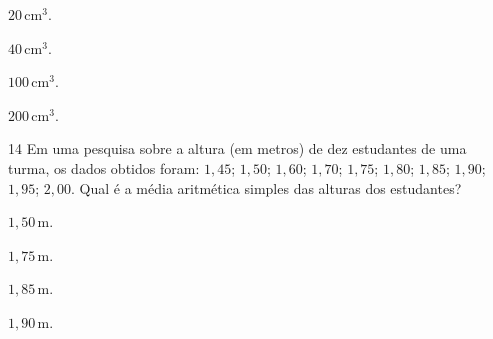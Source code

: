 \begin{escolha}
\item $20\,\text{cm}^3$.
\item $40\,\text{cm}^3$.
\item $100\,\text{cm}^3$.
\item $200\,\text{cm}^3$.
\end{escolha}



\num{14} Em uma pesquisa sobre a altura (em metros) de dez estudantes de uma turma, os
dados obtidos foram: $1,45$; $1,50$; $1,60$; $1,70$; $1,75$; $1,80$;
$1,85$; $1,90$; $1,95$; $2,00$. Qual é a média aritmética simples das
alturas dos estudantes?

\begin{escolha}
\item $1,50\,\text{m}$.
\item $1,75\,\text{m}$.
\item $1,85\,\text{m}$.
\item $1,90\,\text{m}$.
\end{escolha}

